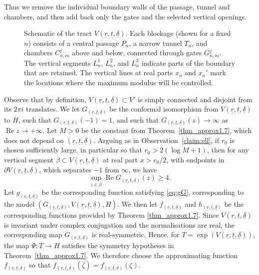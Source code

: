 \documentclass[a4paper, 11pt, reqno]{amsart}
\numberwithin{equation}{section}
\theoremstyle{plain}
\theoremstyle{remark}
\newcommand{\uldelta}{\underline{\delta}}
\newcommand{\ulr}{\underline{r}}
\newcommand{\ult}{\underline{t}}
\newcommand{\Rea}{\operatorname{Re }}
\begin{document}
Thus we remove the individual boundary walls of the passage, tunnel and chambers, and then add back only the gates and the selected vertical openings. 
\begin{figure}[htp]	
	\centering
	\def\svgwidth{\linewidth}
	
	\caption{Schematic of the tract $V(\ulr,\ult,\uldelta)$. 
		Each blockage (shown for a fixed $n$) consists of a central passage $P_n$, a narrow tunnel $T_n$, 
		and chambers $C^{j}_{n,m}$ above and below, connected through gates $G^{j}_{n,m}$. 
		The vertical segments $L^1_n$, $L^2_n$, and $L^3_n$ indicate parts of the boundary that are retained. 
		The vertical lines at real parts $x_n$ and $x_n'$ mark the locations where the maximum modulus will be controlled.}\label{fig:tract_Erdos}
\end{figure}


Observe that by definition, $V(\ulr, \ult, \uldelta)\subset V'$ is simply connected and disjoint from its $2\pi i$ translates. We let $G_{(\ulr, \ult, \uldelta)}$ be the conformal isomorphism from $V(\ulr, \ult, \uldelta)$ to $H$, such that $G_{(\ulr, \ult, \uldelta)}(-1) = 1$, and such that $G_{(\ulr, \ult, \uldelta)}(z) \rightarrow \infty$ as $\Rea z \rightarrow +\infty$. Let $M > 0$ be the constant from Theorem~\ref{thm_approx1.7}, which does not depend on $(\ulr, \ult, \uldelta)$.
Arguing as in Observation~\ref{claim:ell}, if \(r_0\) is chosen sufficiently large, in particular so that \(r_0>2(\log M+1)\), then for any vertical segment \(\beta\subset V(\ulr,\ult,\uldelta)\) at real part \(x>r_0/2\), with endpoints in \(\partial V(\ulr,\ult,\uldelta)\), which separates \(-1\) from \(\infty\), we have
\begin{equation}
	\label{eq:G_2}
	\sup_{z \in \beta} \Rea G_{(\ulr, \ult, \uldelta)}(z) \geq 4.
\end{equation}
Let $g_{{(\ulr, \ult, \uldelta)}}$ be the corresponding function satisfying \eqref{eq:gG}, corresponding to the model $(G_{(\ulr, \ult, \uldelta)}, V(\ulr, \ult, \uldelta), H)$. We then let $f_{{(\ulr, \ult, \uldelta)}}$ and $h_{{(\ulr, \ult, \uldelta)}}$ be the corresponding functions provided by Theorem \ref{thm_approx1.7}. Since \(V(\ulr,\ult,\uldelta)\) is invariant under complex conjugation and the
normalisations are real, the corresponding map \(G_{(\ulr,\ult,\uldelta)}\) is
real-symmetric. Hence, for \(T=\exp(V(\ulr,\ult,\uldelta))\), the map
\(\Psi\colon T\to H\) satisfies the symmetry hypotheses in
Theorem~\ref{thm_approx1.7}. We therefore choose the approximating function
\(f_{(\ulr,\ult,\uldelta)}\) so that
\(f_{(\ulr,\ult,\uldelta)}(\bar\zeta)=
\overline{f_{(\ulr,\ult,\uldelta)}(\zeta)}\).
\end{document}
